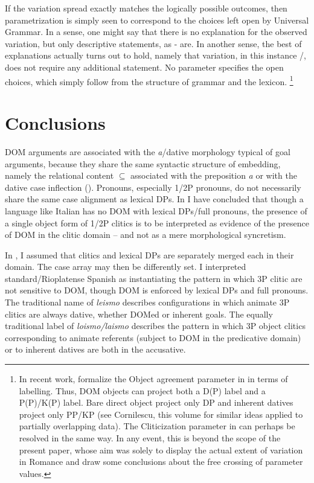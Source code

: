 \documentclass[output=paper,colorlinks,citecolor=brown,nonflat]{./langscibook}
\begin{document}
If the variation spread exactly matches the logically possible outcomes, then parametrization is simply seen to correspond to the choices left open by Universal Grammar. In a sense, one might say that there is no explanation for the observed variation, but only descriptive statements, as - are. In another sense, the best of explanations actually turns out to hold, namely that variation, in this instance /, does not require any additional statement. No parameter specifies the open choices, which simply follow from the structure of grammar and the lexicon.{} \footnote{In recent work, \citet{ManziniFranco2019} formalize the Object agreement parameter in  in terms of labelling. Thus, DOM objects can project both a D(P) label and a P(P)/K(P) label. Bare direct object project only DP and inherent datives project only PP/KP (see Cornilescu, this volume for similar ideas applied to partially overlapping data). The Cliticization parameter in  can perhaps be resolved in the same way. In any event, this is beyond the scope of the present paper, whose aim was solely to display the actual extent of variation in Romance and draw some conclusions about the free crossing of parameter values.} 

\section{ Conclusions}\label{sec:manzini:4}

DOM arguments are associated with the \textit{a}/dative morphology typical of goal arguments, because they share the same syntactic structure of embedding, namely the relational content ${\subseteq}$ associated with the preposition \textit{a} or with the dative case inflection (). Pronouns, especially 1/2P pronouns, do not necessarily share the same case alignment as lexical DPs. In  I have concluded that though a language like Italian has no DOM with lexical DPs/full pronouns, the presence of a single object form of 1/2P clitics is to be interpreted as evidence of the presence of DOM in the clitic domain – and not as a mere morphological syncretism.

In , I assumed that clitics and lexical DPs are separately merged each in their domain. The case array may then be differently set. I interpreted standard/Rioplatense Spanish as instantiating the pattern in which 3P clitic are not sensitive to DOM, though DOM is enforced by lexical DPs and full pronouns. The traditional name of \textit{leismo} describes configurations in which animate 3P clitics are always dative, whether DOMed or inherent goals. The equally traditional label of \textit{loismo/laismo} describes the pattern in which 3P object clitics corresponding to animate referents (subject to DOM in the predicative domain) or to inherent datives are both in the accusative. 

\sloppy
\printbibliography[heading=subbibliography,notkeyword=this] 
\end{document}
